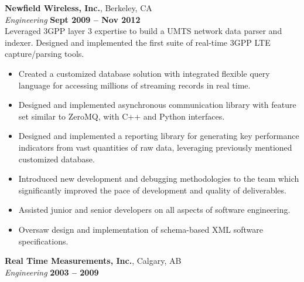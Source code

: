 \documentclass[margin,line]{resume}
\begin{document}
\begin{resume}
    \textbf{Newfield Wireless, Inc.}, Berkeley, CA \vspace{2mm}\\\vspace{1mm}%
    \textsl{Engineering} \hfill \textbf{Sept 2009 -- Nov 2012}\\
    Leveraged 3GPP layer 3 expertise to build a UMTS network data parser and
    indexer. Designed and implemented the first suite of real-time 3GPP LTE
    capture/parsing tools.

    \begin{itemize}
        \item Created a customized database solution with integrated flexible
        query language for accessing millions of streaming records in real time.
        \item Designed and implemented asynchronous communication library with
        feature set similar to ZeroMQ, with C++ and Python interfaces.
        \item Designed and implemented a reporting library for generating key
        performance indicators from vast quantities of raw data, leveraging
        previously mentioned customized database.
        \item Introduced new development and debugging methodologies to the team
        which significantly improved the pace of development and quality of
        deliverables.
        \item Assisted junior and senior developers on all aspects of software
        engineering.
        \item Oversaw design and implementation of schema-based XML software
        specifications.
    \end{itemize}
    
    \textbf{Real Time Measurements, Inc.}, Calgary, AB \vspace{2mm}\\\vspace{1mm}%
    \textsl{Engineering} \hfill \textbf{2003 -- 2009}\\


\end{resume}
\end{document}
